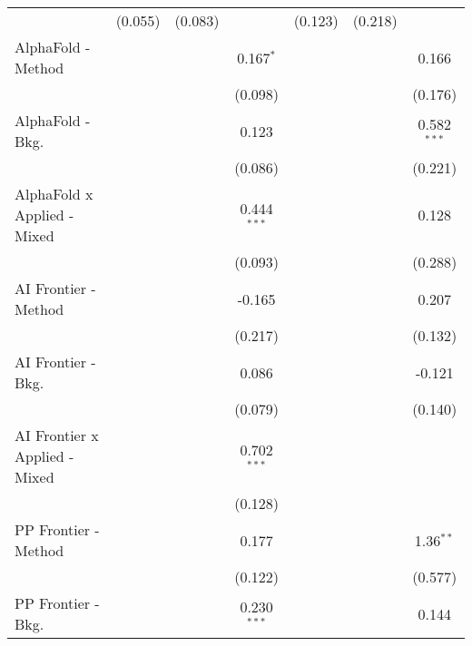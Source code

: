 \begin{tabular}{lcccccc}
                                  & (0.055)        & (0.083)        &                & (0.123)       & (0.218) &   \\   
   AlphaFold - Method             &                &                & 0.167$^{*}$    &               &         & 0.166\\   
                                  &                &                & (0.098)        &               &         & (0.176)\\   
   AlphaFold - Bkg.               &                &                & 0.123          &               &         & 0.582$^{***}$\\   
                                  &                &                & (0.086)        &               &         & (0.221)\\   
   AlphaFold x Applied - Mixed    &                &                & 0.444$^{***}$  &               &         & 0.128\\   
                                  &                &                & (0.093)        &               &         & (0.288)\\   
   AI Frontier - Method           &                &                & -0.165         &               &         & 0.207\\   
                                  &                &                & (0.217)        &               &         & (0.132)\\   
   AI Frontier - Bkg.             &                &                & 0.086          &               &         & -0.121\\   
                                  &                &                & (0.079)        &               &         & (0.140)\\   
   AI Frontier x Applied - Mixed  &                &                & 0.702$^{***}$  &               &         &   \\   
                                  &                &                & (0.128)        &               &         &   \\   
   PP Frontier - Method           &                &                & 0.177          &               &         & 1.36$^{**}$\\   
                                  &                &                & (0.122)        &               &         & (0.577)\\   
   PP Frontier - Bkg.             &                &                & 0.230$^{***}$  &               &         & 0.144\\   

\end{tabular}
